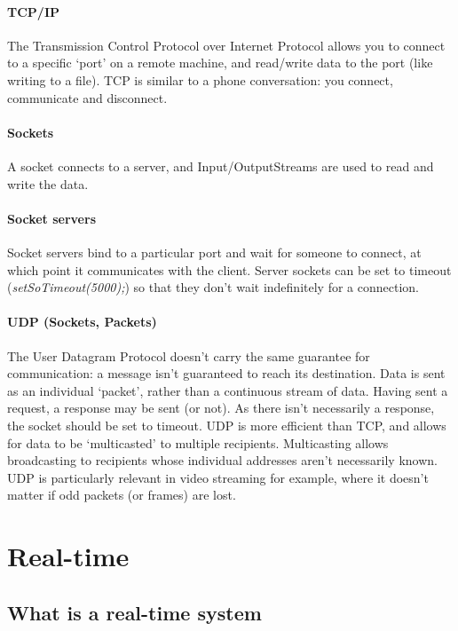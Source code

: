\documentclass[a4paper,oneside]{report}
\begin{document}
      		\subsubsection{TCP/IP}
      		The Transmission Control Protocol over Internet Protocol allows you to connect to a specific `port' on a remote machine, and read/write data to the port (like writing to a file). TCP is similar to a phone conversation: you connect, communicate and disconnect.     		
        	\subsubsection{Sockets}
        	A socket connects to a server, and Input/OutputStreams are used to read and write the data.
        	
        	\subsubsection{Socket servers}
        	Socket servers bind to a particular port and wait for someone to connect, at which point it communicates with the client. Server sockets can be set to timeout (\emph{setSoTimeout(5000);}) so that they don't wait indefinitely for a connection.
        	
      		\subsubsection{UDP (Sockets, Packets)}
      		The User Datagram Protocol doesn't carry the same guarantee for communication: a message isn't guaranteed to reach its destination. Data is sent as an individual `packet', rather than a continuous stream of data. Having sent a request, a response may be sent (or not). As there isn't necessarily a response, the socket should be set to timeout. UDP is more efficient than TCP, and allows for data to be `multicasted' to multiple recipients. Multicasting allows broadcasting to recipients whose individual addresses aren't necessarily known. UDP is particularly relevant in video streaming for example, where it doesn't matter if odd packets (or frames) are lost.
    	
\chapter{Real-time}
  	\section{What is a real-time system}
  	
\end{document}
